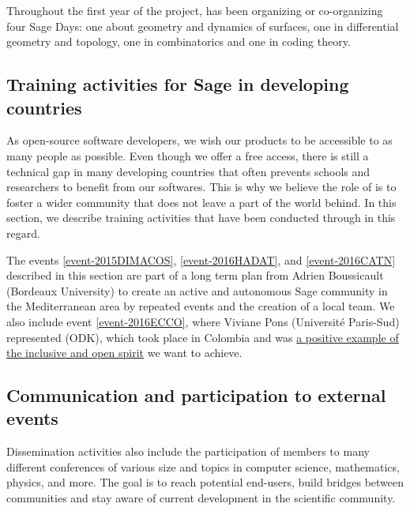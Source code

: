 \documentclass{deliverablereport}
\begin{document}
Throughout the first year of the project, \ODK has been organizing or co-organizing
four Sage Days: one about geometry and dynamics of surfaces, one in differential geometry and topology,
 one in combinatorics and one in coding theory.








\newpage
\subsection{Training activities for Sage in developing countries}

As open-source software developers, we wish our products
to be accessible to as many people as possible. Even though we offer
 a free access, there is still a technical gap in many 
developing countries that 
often prevents schools and researchers to benefit from our softwares.
This is why we believe the role of \ODK is to foster 
a wider community that does not leave a part of the world behind. In 
this section, we describe training activities that have been conducted 
through \ODK in this regard.



The events \ref{event-2015DIMACOS}, \ref{event-2016HADAT}, and
\ref{event-2016CATN} described in this section are part of a long term
plan from Adrien Boussicault (Bordeaux University) to create an active
and autonomous Sage community in the Mediterranean area by repeated
events and the creation of a local team. We also include event
\ref{event-2016ECCO}, where Viviane Pons (Université Paris-Sud)
represented \ODK (ODK), which took place in Colombia and was
\href{http://blogs.ams.org/matheducation/2016/08/22/an-inclusive-maths-conference-ecco-2016/}
{a positive example of the inclusive and open spirit} we want to
achieve.








\newpage

\subsection{Communication and participation to external events}

Dissemination activities also include the participation of \ODK
members to many different conferences of various size and topics
in computer science, mathematics, physics, and more. The goal is
to reach potential end-users, build bridges between communities and stay aware 
of current development in the scientific community.
\end{document}
